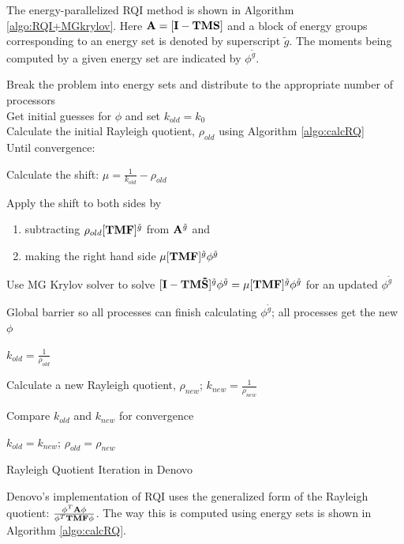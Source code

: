 The energy-parallelized RQI method is shown in Algorithm \ref{algo:RQI+MGkrylov}. Here $\mathbf{A} = [\mathbf{I} - \mathbf{TMS}]$ and a block of energy groups corresponding to an energy set is denoted by superscript ${\tilde{g}}$. The moments being computed by a given energy set are indicated by $\phi^{\tilde{g}}$.
%
\begin{algorithm}[!h]
  Break the problem into energy sets and distribute to the appropriate number of processors\\
  Get initial guesses for $\phi$ and set $k_{old} = k_{0}$\\
  Calculate the initial Rayleigh quotient, $\rho_{old}$ using Algorithm \ref{algo:calcRQ}\\
  Until convergence:
  \begin{list}{}{\hspace{2.5em}}
     \item Calculate the shift: $\mu = \frac{1}{k_{old}} - \rho_{old}$
     \item Apply the shift to both sides by 
     \begin{enumerate}
       \item subtracting $\rho_{old} [\mathbf{TMF}]^{\tilde{g}}$ from $\mathbf{A}^{\tilde{g}}$ and 
       \item making the right hand side $\mu [\mathbf{TMF}]^{\tilde{g}} \phi^{\tilde{g}}$
    \end{enumerate}
    \item Use MG Krylov solver to solve $[\mathbf{I} - \mathbf{TM\tilde{S}}]^{\tilde{g}}\phi^{\tilde{g}} = \mu [\mathbf{TMF}]^{\tilde{g}} \phi^{\tilde{g}}$ for an updated $\phi^{\tilde{g}}$
    \item Global barrier so all processes can finish calculating $\phi^{\tilde{g}}$; all processes get the new $\phi$
    \item $k_{old} = \frac{1}{\rho_{old}}$
    \item Calculate a new Rayleigh quotient, $\rho_{new}$; $k_{new} = \frac{1}{\rho_{new}}$
    \item Compare $k_{old}$ and $k_{new}$ for convergence 
    \item $k_{old} = k_{new}$; $\rho_{old} = \rho_{new}$
  \end{list}
  \caption{Rayleigh Quotient Iteration in Denovo}
  \label{algo:RQI+MGkrylov}
\end{algorithm}
%
Denovo's implementation of RQI uses the generalized form of the Rayleigh quotient: $\frac{\phi^{T} \mathbf{A} \phi}{\phi^{T} \mathbf{TMF} \phi}$. The way this is computed using energy sets is shown in Algorithm \ref{algo:calcRQ}. 
